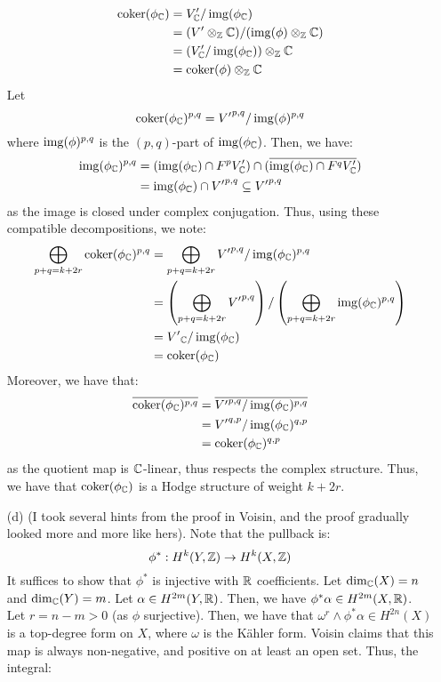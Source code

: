 \documentclass[12pt]{article}
\begin{document}
\begin{solution}
\begin{enumerate}
\begin{align*}
            \operatorname{coker}(\phi_\mathbb C) &= V'_\mathbb C / \operatorname{img}(\phi_\mathbb C) \\
            &= (V' \otimes_\mathbb Z \mathbb C)/(\operatorname{img}(\phi) \otimes_\mathbb Z \mathbb C) \\
            &= (V'_\mathbb C / \operatorname{img}(\phi_\mathbb C)) \otimes_\mathbb Z \mathbb C \\
            &= \operatorname{coker}(\phi) \otimes_\mathbb Z \mathbb C
        \end{align*}
        Let
        \[ \operatorname{coker}(\phi_\mathbb C)^{p,q} = {V'}^{p,q} / \operatorname{img}(\phi)^{p,q}\]
        where $\operatorname{img}(\phi)^{p,q}$ is the $(p,q)$-part of $\operatorname{img}(\phi_\mathbb C)$. Then, we have:
        \begin{align*}
            \operatorname{img}(\phi_\mathbb C)^{p,q} &= (\operatorname{img}(\phi_\mathbb C) \cap F^{p} V'_\mathbb C) \cap (\overline{\operatorname{img}(\phi_\mathbb C) \cap F^{q} V'_\mathbb C}) \\
            &= \operatorname{img}(\phi_\mathbb C) \cap {V'}^{p,q} \subseteq {V'}^{p,q}
        \end{align*}
        as the image is closed under complex conjugation. Thus, using these compatible decompositions, we note:  
        \begin{align*}
            \bigoplus_{p+q = k+2r} \operatorname{coker}(\phi_\mathbb C)^{p,q} &= \bigoplus_{p+q = k+2r} {V'}^{p,q} / \operatorname{img}(\phi_\mathbb C)^{p,q} \\
            &= \left(\bigoplus_{p+q = k+2r} {V'}^{p,q}\right)/ \left(\bigoplus_{p+q = k+2r} \operatorname{img}(\phi_\mathbb C)^{p, q}  \right) \\
            &= {V'}_\mathbb C / \operatorname{img}(\phi_\mathbb C) \\
            &= \operatorname{coker}(\phi_\mathbb C)
        \end{align*}
        Moreover, we have that:
        \begin{align*}
            \overline{\operatorname{coker}(\phi_\mathbb C)^{p,q}} &= \overline{{V'}^{p,q} / \operatorname{img}(\phi_\mathbb C)^{p,q}} \\
            &= {V'}^{q,p} / \operatorname{img}(\phi_\mathbb C)^{q,p} \\
            &= \operatorname{coker}(\phi_\mathbb C)^{q, p}            
        \end{align*}
        as the quotient map is $\mathbb C$-linear, thus respects the complex structure. Thus, we have that $\operatorname{coker}(\phi_\mathbb C)$ is a Hodge structure of weight $k+2r$.
        \item[(d)] (I took several hints from the proof in Voisin, and the proof gradually looked more and more like hers). \bbni 
        Note that the pullback is: 
        \[ \phi^*: H^k(Y, \mathbb Z) \to H^k(X, \mathbb Z)\]
        It suffices to show that $\phi^*$ is injective with $\mathbb R$ coefficients. Let $\dim_\mathbb C(X) = n$ and $\dim_\mathbb C(Y) = m$. Let $\alpha \in H^{2m}(Y, \mathbb R)$. Then, we have $\phi^*\alpha \in H^{2m}(X, \mathbb R)$. Let $r = n-m > 0$ (as $\phi$ surjective). Then, we have that $\omega^r \wedge \phi^*\alpha \in H^{2n}(X)$ is a top-degree form on $X$, where $\omega$ is the K\"ahler form. Voisin claims that this map is always non-negative, and positive on at least an open set. Thus, the integral:

\end{enumerate}
\end{solution}
\end{document}
